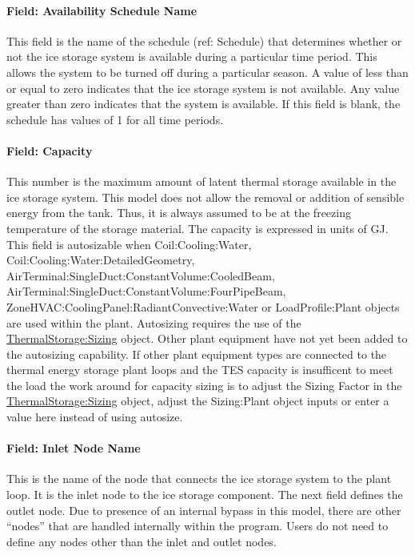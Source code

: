 \paragraph{Field: Availability Schedule Name}\label{field-availability-schedule-name-012}

This field is the name of the schedule (ref: Schedule) that determines whether or not the ice storage system is available during a particular time period. This allows the system to be turned off during a particular season. A value of less than or equal to zero indicates that the ice storage system is not available. Any value greater than zero indicates that the system is available. If this field is blank, the schedule has values of 1 for all time periods.

\paragraph{Field: Capacity}\label{field-capacity-1-000}

This number is the maximum amount of latent thermal storage available in the ice storage system. This model does not allow the removal or addition of sensible energy from the tank. Thus, it is always assumed to be at the freezing temperature of the storage material. The capacity is expressed in units of GJ. This field is autosizable when Coil:Cooling:Water, Coil:Cooling:Water:DetailedGeometry, AirTerminal:SingleDuct:ConstantVolume:CooledBeam, AirTerminal:SingleDuct:ConstantVolume:FourPipeBeam, ZoneHVAC:CoolingPanel:RadiantConvective:Water or LoadProfile:Plant objects are used within the plant. Autosizing requires the use of the \hyperref[thermalstoragesizing]{ThermalStorage:Sizing} object. Other plant equipment have not yet been added to the autosizing capability. If other plant equipment types are connected to the thermal energy storage plant loops and the TES capacity is insufficent to meet the load the work around for capacity sizing is to adjust the Sizing Factor in the \hyperref[thermalstoragesizing]{ThermalStorage:Sizing} object, adjust the Sizing:Plant object inputs or enter a value here instead of using autosize.

\paragraph{Field: Inlet Node Name}\label{field-inlet-node-name-1-001}

This is the name of the node that connects the ice storage system to the plant loop. It is the inlet node to the ice storage component. The next field defines the outlet node. Due to presence of an internal bypass in this model, there are other ``nodes'' that are handled internally within the program. Users do not need to define any nodes other than the inlet and outlet nodes.

